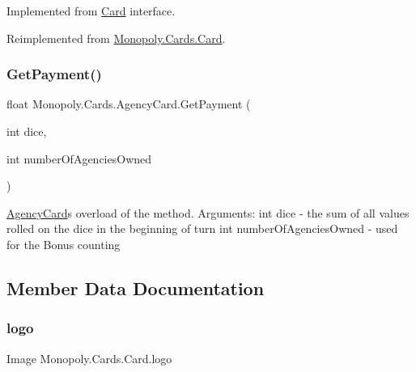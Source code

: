 Implemented from \mbox{\hyperlink{class_monopoly_1_1_cards_1_1_card}{Card}} interface. 

Reimplemented from \mbox{\hyperlink{class_monopoly_1_1_cards_1_1_card_a3a30376e286fdae69bf7c77cd6620fe3}{Monopoly.\+Cards.\+Card}}.

\mbox{\label{class_monopoly_1_1_cards_1_1_agency_card_a53d78c8afb2c5043dbb016d46e8102ce}} 
\subsubsection{\texorpdfstring{Get\+Payment()}{GetPayment()}\hspace{0.1cm}{\footnotesize\ttfamily [2/2]}}
{\footnotesize\ttfamily float Monopoly.\+Cards.\+Agency\+Card.\+Get\+Payment (\begin{DoxyParamCaption}\item[{int}]{dice,  }\item[{int}]{number\+Of\+Agencies\+Owned }\end{DoxyParamCaption})\hspace{0.3cm}{\ttfamily [inline]}}

\mbox{\hyperlink{class_monopoly_1_1_cards_1_1_agency_card}{Agency\+Card}}\textquotesingle{}s overload of the method. Arguments\+: int dice -\/ the sum of all values rolled on the dice in the beginning of turn int number\+Of\+Agencies\+Owned -\/ used for the Bonus counting 

\subsection{Member Data Documentation}
\mbox{\label{class_monopoly_1_1_cards_1_1_card_a84da6fc446a55518f9bdf8fa7eef9057}} 
\subsubsection{\texorpdfstring{logo}{logo}}
{\footnotesize\ttfamily Image Monopoly.\+Cards.\+Card.\+logo\hspace{0.3cm}{\ttfamily [inherited]}}



